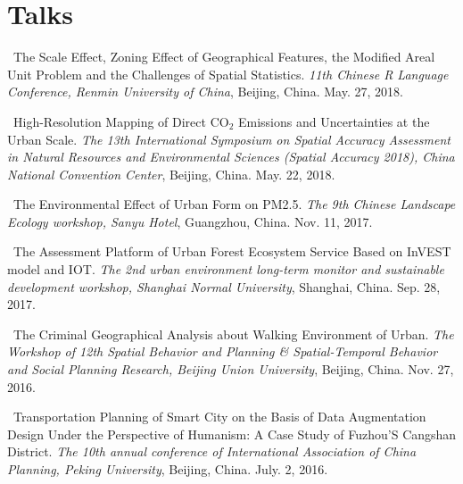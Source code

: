 \section*{Talks}
\begin{etaremune}
\item
    \Shaoqing\
    The Scale Effect, Zoning Effect of Geographical Features, the Modified Areal Unit Problem and the Challenges of Spatial Statistics.
    \textit{11th Chinese R Language Conference, Renmin University of China}, Beijing, China.
    May. 27, 2018.
\item
    \Shaoqing\
    High-Resolution Mapping of Direct CO$_2$ Emissions and Uncertainties at the Urban Scale.
    \textit{The 13th International Symposium on Spatial Accuracy Assessment in Natural Resources and Environmental Sciences (Spatial Accuracy 2018), China National Convention Center}, Beijing, China.
    May. 22, 2018.
\item
    \Shaoqing\
    The Environmental Effect of Urban Form on PM2.5. 
    \textit{The 9th Chinese Landscape Ecology workshop, Sanyu Hotel}, Guangzhou, China.
    Nov. 11, 2017.
\item
    \Shaoqing\
    The Assessment Platform of Urban Forest Ecosystem Service Based on InVEST model and IOT.
    \textit{The 2nd urban environment long-term monitor and sustainable development workshop, Shanghai Normal University}, Shanghai, China.
    Sep. 28, 2017.
    \invited
\item
    \Shaoqing\
    The Criminal Geographical Analysis about Walking Environment of Urban.
    \textit{The Workshop of 12th Spatial Behavior and Planning \& Spatial-Temporal Behavior and Social Planning Research, Beijing Union University}, Beijing, China.
    Nov. 27, 2016.
\item
    \Shaoqing\
    Transportation Planning of Smart City on the Basis of Data Augmentation Design Under the Perspective of Humanism: A Case Study of Fuzhou’S Cangshan District.
    \textit{The 10th annual conference of International Association of China Planning, Peking University}, Beijing, China.
    July. 2, 2016.
\end{etaremune}

